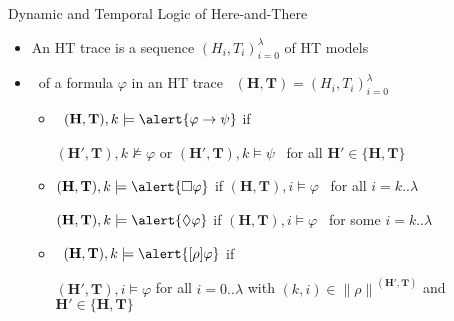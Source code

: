 \begin{frame}{Dynamic and Temporal Logic of Here-and-There}
  \newcommand{\M}{\ensuremath{(\mathbf{H},\mathbf{T})}}
  \newcommand{\alwaysF}{\ensuremath{\square}}
  \newcommand{\eventuallyF}{\ensuremath{\Diamond}}
  \begin{itemize}
  \item<2->  An HT trace is a sequence $(H_i,T_i)_{i=0}^{\lambda}$ of HT models
    \medskip
  \item<3->  \ of a formula $\varphi$ in an HT trace \ $\M=(H_i,T_i)_{i=0}^{\lambda}$
    \smallskip
    \begin{itemize}\normalsize
    \item<4-> 
      \
      $\M, k \models \alert{\varphi \to \psi}$
      \pause[5]
      \small
      if
      \smallskip

      $( \mathbf{H}', \mathbf{T} ), k \not \models \varphi$
      or
      $( \mathbf{H}', \mathbf{T} ), k \models  \psi$ \ for all $\mathbf{H'} \in \{ \mathbf{H}, \mathbf{T} \}$
      \medskip

    \item<6-> 
      \small

      \smallskip
      $\M, k \models \alert{\alwaysF\varphi}$
      if
      $\M, i \models \varphi$ \ for all $i=k..\lambda$

      \smallskip
      $\M, k \models \alert{\eventuallyF\varphi}$
      if
      $\M, i \models \varphi$ \ for some $i=k..\lambda$
      \medskip

    \item<7-> 
      \
      $\M, k \models \alert{[\rho]\varphi}$
      \pause[8]
      if\smallskip

      \small
      $( \mathbf{H'}, \mathbf{T} ),i \models \varphi$
      for all $i=0..\lambda$ with $(k,i) \in {\parallel\rho\parallel}^{( \mathbf{H'}, \mathbf{T} )}$ and $\mathbf{H'} \in \{ \mathbf{H}, \mathbf{T} \}$
    \end{itemize}
  \end{itemize}
\end{frame}
